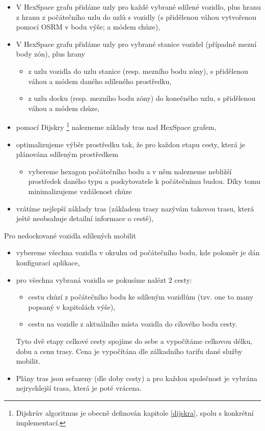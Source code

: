 \documentclass[thesis=M,czech]{FITthesis}[2019/12/23]
\theoremstyle{plain}
\theoremstyle{definition}
\begin{document}
\begin{enumerate}
\begin{itemize}
		\item V HexSpace grafu přidáme uzly pro každé vybrané sdílené vozidlo, plus hranu z hranu z počátečního uzlu do uzlů s vozidly (s přidělenou váhou vytvořenou pomocí OSRM v bodu výše; a módem chůze),
		\item V HexSpace grafu přidáme uzly pro vybrané stanice vozidel (případně mezní body zón), plus hrany 
		\begin{itemize}
			\item z uzlu vozidla do uzlu stanice (resp. mezního bodu zóny), s přidělenou váhou a módem daného sdíleného prostředku,
			\item z uzlu docku (resp. mezního bodu zóny) do konečného uzlu, s přidělenou váhou a módem chůze,
		\end{itemize}

		\item pomocí Dijskry \footnote{Dijskrův algoritmus je obecně definován kapitole \ref{dijskra}, spolu s konkrétní implementací.} nalezneme základy tras nad HexSpace grafem,

		\item optimalizujeme výběr prostředku tak, že pro každou etapu cesty, která je plánována sdíleným prostředkem
		\begin{itemize}
			\item vybereme hexagon počátečního bodu a v něm nalezneme nebližší prostředek daného typu a poskytovatele k počátečnímu budou. Díky tomu minimalizujeme vzdálenost chůze
		\end{itemize}

		\item vrátíme nejlepší základy tras (základem trasy nazývám takovou trasu, která ještě neobsahuje detailní informace o cestě),
	\end{itemize}
	Pro nedockované vozidla sdílených mobilit
	\begin{itemize}
		\item vybereme všechna vozidla v okruhu od počátečního bodu, kde poloměr je dán konfigurací aplikace,
		\item pro všechna vybraná vozidla se pokusíme nalézt 2 cesty:
		\begin{itemize}
			\item cestu chůzí z počátečního bodu ke sdíleným vozidlům (tzv. one to many popsaný v kapitolách výše),
			\item cestu na vozidle z aktuálního místa vozidla do cílového bodu cesty.
		\end{itemize}
		Tyto dvě etapy celkové cesty spojíme do sebe a vypočítáme celkovou délku, dobu a cenu trasy. Cena je vypočítána dle zálkadního tarifu dané služby mobilit.
		\item Plány tras jsou seřazeny (dle doby cesty) a pro každou společnost je vybrána nejrychlejší trasa, která je poté vrácena.
	

\end{itemize}
\end{enumerate}
\end{document}
